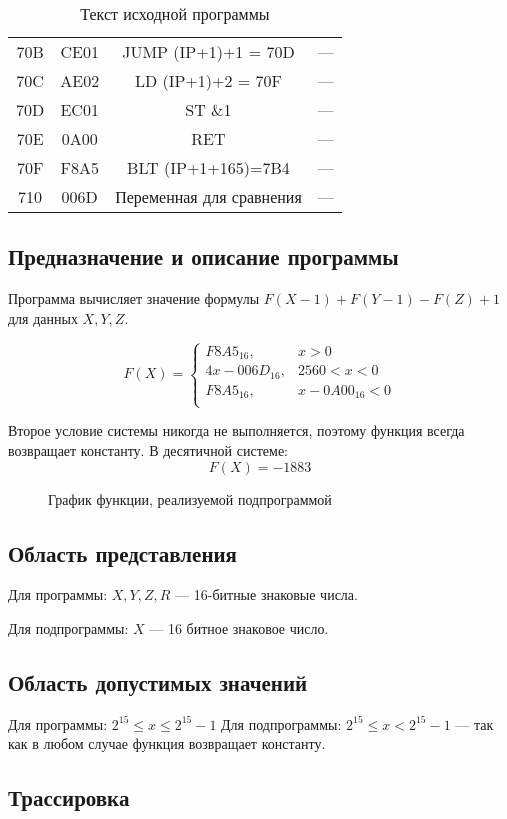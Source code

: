 \begin{table}[h!]
\begin{longtable}{| c | c | c | p{9.5cm} |}
        70B   & CE01        & JUMP (IP+1)+1 = 70D & ---                                                   \\
        70C   & AE02        & LD (IP+1)+2 = 70F   & ---                                                   \\
        70D   & EC01        & ST \&1              & ---                                                   \\
        70E   & 0A00        & RET                 & ---                                                   \\
        70F   & F8A5        & BLT (IP+1+165)=7B4  & ---                                                   \\
        710 & 006D & Переменная для сравнения & --- \\
        \hline
    \end{longtable}
    \caption{Текст исходной программы}
\end{table}

\subsection{Предназначение и описание программы}
Программа вычисляет значение формулы $F(X-1) + F(Y-1) - F(Z) + 1$ для данных $X, Y, Z$.

\[ 
   F(X) = \begin{cases}
    F8A5_{16}, & x > 0 \\
    4x - 006D_{16}, & 2560 < x < 0 \\
    F8A5_{16}, & x - 0A00_{16} < 0 \\
   \end{cases}
\]

Второе условие системы никогда не выполняется, поэтому функция всегда возвращает константу.
В десятичной системе:
\[ 
   F(X) = -1883
\]
\begin{figure}
    \centering
    
    \caption{График функции, реализуемой подпрограммой}
\end{figure}

\subsection{Область представления}
Для программы:
$X, Y, Z, R$ --- 16-битные знаковые числа.

Для подпрограммы: $X$ --- 16 битное знаковое число.
\subsection{Область допустимых значений}

Для программы: $2^{15} \leq x \leq 2^{15} - 1$
Для подпрограммы: $2^{15} \leq x < 2^{15} - 1$ --- так как в любом случае функция возвращает константу.

\subsection{Трассировка}

